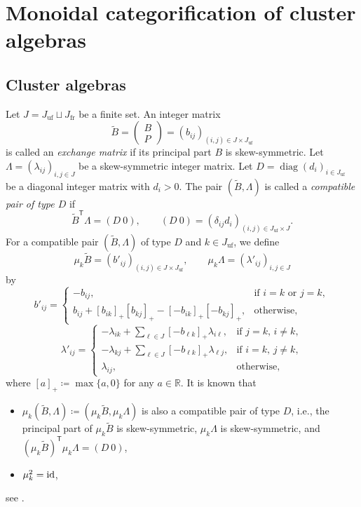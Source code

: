\section{Monoidal categorification of cluster algebras}
\label{Sec : monoidal categorification of cluster algebras}

\subsection{Cluster algebras}
\label{ssec : cluster algebras}

Let $J = J_{\mathrm{uf}} \sqcup J_{\mathrm{fr}}$ be a finite set.
An integer matrix
\[
\widetilde{B}
= \begin{pmatrix} B \\ P \end{pmatrix}
= (b_{ij})_{(i, j) \in J \times J_{\mathrm{uf}}}
\]
is called an \emph{exchange matrix}
if its principal part $B$ is skew-symmetric.
Let $\Lambda = (\lambda_{ij})_{i, j \in J}$
be a skew-symmetric integer matrix.
Let $D = \operatorname{diag}(d_i)_{i \in J_{\mathrm{uf}}}$
be a diagonal integer matrix with $d_i > 0$.
The pair $(\widetilde{B}, \Lambda)$
is called a \emph{compatible pair of type $D$} if
\[
\widetilde{B}^{\mathsf{T}}\Lambda = (D\ 0),
\qquad
(D\ 0) = (\delta_{ij}d_i)_{(i, j) \in J_{\mathrm{uf}} \times J}.
\]
For a compatible pair $(\widetilde{B}, \Lambda)$ of type $D$
and $k \in J_{\mathrm{uf}}$, we define
\[
\mu_k\widetilde{B}
= (b'_{ij})_{(i, j) \in J \times J_{\mathrm{uf}}},
\qquad
\mu_k\Lambda = (\lambda'_{ij})_{i, j \in J}
\]
by
\[
b'_{ij} =
\begin{cases}
    -b_{ij}, & \text{if $i = k$ or $j = k$}, \\
    b_{ij} + [b_{ik}]_+[b_{kj}]_+
    - [-b_{ik}]_+[-b_{kj}]_+, & \text{otherwise},
\end{cases}
\]
\[
\lambda'_{ij} =
\begin{cases}
    -\lambda_{ik}
    + \displaystyle\sum_{\ell \in J}[-b_{\ell k}]_+\lambda_{i\ell},
    & \text{if $j = k$, $i \neq k$}, \\
    -\lambda_{kj}
    + \displaystyle\sum_{\ell \in J}[-b_{\ell k}]_+\lambda_{\ell j},
    & \text{if $i = k$, $j \neq k$}, \\
    \lambda_{ij}, & \text{otherwise},
\end{cases}
\]
where $[a]_+ \coloneq \max\{a, 0\}$ for any $a \in \mathbb{R}$.
It is known that
\begin{itemize}
    \item
    $\mu_k(\widetilde{B}, \Lambda)
    \coloneq (\mu_k\widetilde{B}, \mu_k\Lambda)$
    is also a compatible pair of type $D$,
    i.e., the principal part of $\mu_k\widetilde{B}$ is skew-symmetric,
    $\mu_k\Lambda$ is skew-symmetric, and
    $(\mu_k\widetilde{B})^{\mathsf{T}}\mu_k\Lambda = (D\ 0)$,
    \item $\mu_k^2 = \mathrm{id}$, 
\end{itemize}
see \cite{BZ05}.

